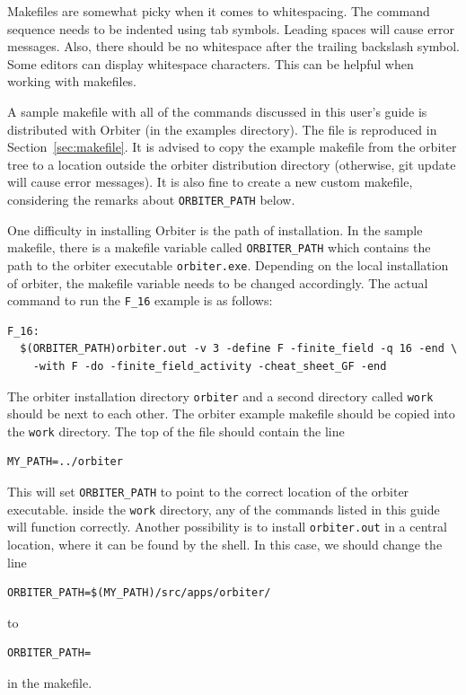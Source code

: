 \bigskip

Makefiles are somewhat picky when it comes to whitespacing.
The command sequence needs to be indented using tab symbols. 
Leading spaces will cause error messages. 
Also, there should be no whitespace after the trailing backslash symbol.
Some editors can display whitespace characters. This can be helpful when 
working with makefiles.



\bigskip

A sample makefile with all of the commands discussed in this user's guide 
is distributed with Orbiter (in the examples directory). 
The file is reproduced in Section~\ref{sec:makefile}. 
It is advised to copy the example makefile from the orbiter tree to a location outside the orbiter 
distribution directory (otherwise, git update will cause error messages). 
It is also fine to create a new custom makefile, considering the remarks about  \verb'ORBITER_PATH' below.



\bigskip


One difficulty in installing Orbiter is the path of installation.
In the sample makefile, there is a makefile variable called 
\verb'ORBITER_PATH' which contains the path to the orbiter executable \verb'orbiter.exe'.
Depending on the local installation of orbiter, 
the makefile variable needs to be changed accordingly. 
The actual command to run the \verb'F_16' example is as follows:
\begin{verbatim}
F_16:
  $(ORBITER_PATH)orbiter.out -v 3 -define F -finite_field -q 16 -end \
    -with F -do -finite_field_activity -cheat_sheet_GF -end
\end{verbatim}
The orbiter installation directory \verb'orbiter' 
and a second directory called \verb'work' should be next to each other. 
The orbiter example makefile should be copied into the \verb'work' directory. 
The top of the file should contain the line
\begin{verbatim}
MY_PATH=../orbiter
\end{verbatim}
This will set \verb'ORBITER_PATH' to point to the correct location of the orbiter executable. 
inside the \verb'work' directory, any of the commands listed in this guide will function correctly.
Another possibility is to install \verb'orbiter.out' in a central location, where it can be found by the shell. 
In this case, we should change the line 
\begin{verbatim}
ORBITER_PATH=$(MY_PATH)/src/apps/orbiter/
\end{verbatim}
to
\begin{verbatim}
ORBITER_PATH=
\end{verbatim}
in the makefile.
